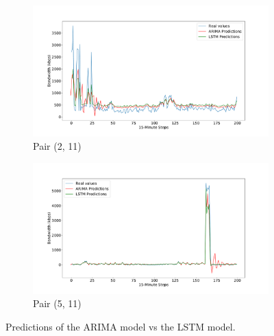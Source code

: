 \begin{figure}
	\begin{subfigure}{1\linewidth}
		\centering
		\includegraphics[width=1\linewidth]{Pictures/Practical_Examples/AvLprediction_1}
		\caption{Pair (2, 11)}
		\label{fig:ARIMAprediction_1}
	\end{subfigure}
	\begin{subfigure}{1\linewidth}
		\centering
		\includegraphics[width=1\linewidth]{Pictures/Practical_Examples/AvLprediction_4}
		\caption{Pair (5, 11)}
		\label{fig:ARIMAprediction_4}
	\end{subfigure}
	\caption{Predictions of the ARIMA model vs the LSTM model.}
	\label{fig:ARIMAprediction1}
\end{figure}

